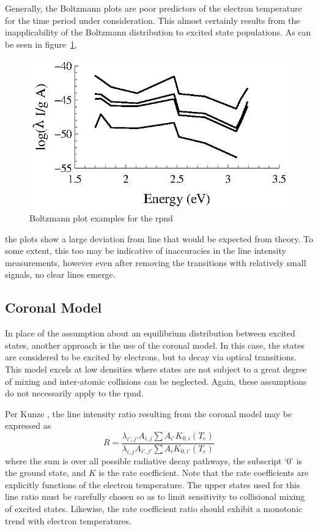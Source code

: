 Generally, the Boltzmann plots are poor predictors of the electron temperature
for the time period under consideration. This almost certainly results from the
inapplicability of the Boltzmann distribution to excited state populations. As
can be seen in figure~\ref{fig:boltex},
\begin{figure}
  \centering
  \includegraphics{./chapters/emissions/figures/boltex.eps}
  \caption{Boltzmann plot examples for the \acs{rpnd}}
  \label{fig:boltex}
\end{figure}
the plots show a large deviation from line that would be expected from theory.
To some extent, this too may be indicative of inaccuracies in the line intensity
measurements, however even after removing the transitions with relatively small
signals, no clear lines emerge. 

\subsection{Coronal Model}

In place of the assumption about an equilibrium distribution between excited
states, another approach is the use of the coronal model. In this case, the
states are considered to be excited by electrons, but to decay via optical
transitions. This model excels at low densities where states are not subject to
a great degree of mixing and inter-atomic collisions can be neglected. Again,
these assumptions do not necessarily apply to the \acs{rpnd}.

Per Kunze \cite{Kunze2009}, the line intensity ratio resulting from the coronal
model may be expressed as
\begin{equation}
  R = \frac{\lambda_{i',j'}A_{i,j}\sum A_{i'} K_{0,i}(T_e)}
  {\lambda_{i,j}A_{i',j'}\sum A_{i} K_{0,i'}(T_e)}
\end{equation}
where the sum is over all possible radiative decay pathways, the subscript `0'
is the ground state, and $K$ is the rate coefficient. Note that the rate
coefficients are explicitly functions of the electron temperature. The upper
states used for this line ratio must be carefully chosen so as to limit
sensitivity to collisional mixing of excited states. Likewise, the rate
coefficient ratio should exhibit a monotonic trend with electron temperatures.

